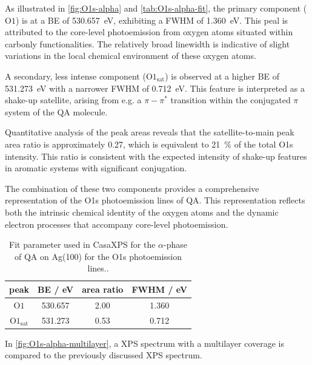 As illustrated in \autoref{fig:O1s-alpha} and \autoref{tab:O1s-alpha-fit}, the primary component ($\mathrm{O1}$) is at a \ac{BE} of 530.657~\si{\eV}, exhibiting a \ac{FWHM} of 1.360~\si{\eV}. This peal is attributed to the core-level photoemission from oxygen atoms situated within carbonly functionalities. The relatively broad linewidth is indicative of slight variations in the local chemical environment of these oxygen atoms.

A secondary, less intense component ($\mathrm{O1_{sat}}$) is observed at a higher \ac{BE} of 531.273~\si{\eV} with a narrower \ac{FWHM} of 0.712~\si{\eV}. This feature is interpreted as a shake-up satellite, arising from e.g. a $\pi-\pi^*$ transition within the conjugated $\pi$ system of the \ac{QA} molecule.

Quantitative analysis of the peak areas reveals that the satellite-to-main peak area ratio is approximately 0.27, which is equivalent to 21~\% of the total O1s intensity. This ratio is consistent with the expected intensity of shake-up features in aromatic systems with significant conjugation.\autocite{Bauer2014}

The combination of these two components provides a comprehensive representation of the O1s photoemission lines of \ac{QA}. This representation reflects both the intrinsic chemical identity of the oxygen atoms and the dynamic electron processes that accompany core-level photoemission.

\begin{table}[H]
	\centering
	\caption{Fit parameter used in CasaXPS\autocite{CASA2022} for the $\alpha$-phase of \ac{QA} on Ag(100) for the O1s photoemission lines..}
	\begin{tabular}{|c|c|c|c|}
		\hline
		peak & \ac{BE} / eV & area ratio & FWHM / eV \\
		\hline
		$\mathrm{O1}$ & 530.657 & 2.00 & 1.360 \\ \hline
		$\mathrm{O1_{sat}}$ & 531.273 & 0.53 & 0.712 \\ \hline
	\end{tabular}
	\label{tab:O1s-alpha-fit}
\end{table}

In \autoref{fig:O1s-alpha-multilayer}, a \ac{XPS} spectrum with a multilayer coverage is compared to the previously discussed \ac{XPS} spectrum.

